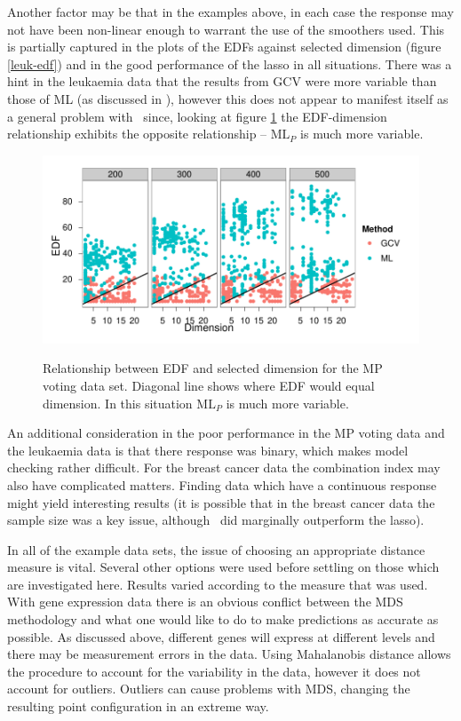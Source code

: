 Another factor may be that in the examples above, in each case the response may not have been non-linear enough to warrant the use of the smoothers used. This is partially captured in the plots of the EDFs against selected dimension (figure \ref{leuk-edf}) and in the good performance of the lasso in all situations. There was a hint in the leukaemia data that the results from GCV were more variable than those of ML (as discussed in ), however this does not appear to manifest itself as a general problem with \mdsds\ since, looking at figure \ref{mps-edf-dim} the EDF-dimension relationship exhibits the opposite relationship -- $\text{ML}_P$ is much more variable.

\begin{figure}
\centering
\includegraphics[width=6in]{gds/figs/mps-dim-edf.pdf} \\
\caption{Relationship between EDF and selected dimension for the MP voting data set. Diagonal line shows where EDF would equal dimension. In this situation $\text{ML}_P$ is much more variable.}
\label{mps-edf-dim}
\end{figure}

An additional consideration in the poor performance in the MP voting data and the leukaemia data is that there response was binary, which makes model checking rather difficult. For the breast cancer data the combination index may also have complicated matters. Finding data which have a continuous response might yield interesting results (it is possible that in the breast cancer data the sample size was a key issue, although \mdsds\ did marginally outperform the lasso).

In all of the example data sets, the issue of choosing an appropriate distance measure is vital. Several other options were used before settling on those which are investigated here. Results varied according to the measure that was used. With gene expression data there is an obvious conflict between the MDS methodology and what one would like to do to make predictions as accurate as possible. As discussed above, different genes will express at different levels and there may be measurement errors in the data. Using Mahalanobis distance allows the procedure to account for the variability in the data, however it does not account for outliers. Outliers can cause problems with MDS, changing the resulting point configuration in an extreme way.

